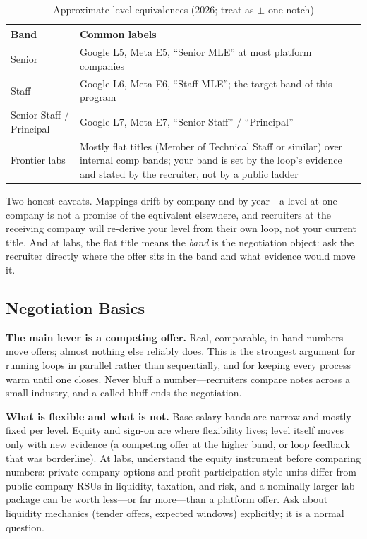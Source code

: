 \begin{table}[H]
\centering
\small
\caption{Approximate level equivalences (2026; treat as $\pm$ one notch)}
\label{tab:level_mapping}
\begin{tabularx}{\textwidth}{lX}
\toprule
\textbf{Band} & \textbf{Common labels} \\
\midrule
Senior & Google L5, Meta E5, ``Senior MLE'' at most platform companies \\
Staff & Google L6, Meta E6, ``Staff MLE''; the target band of this program \\
Senior Staff / Principal & Google L7, Meta E7, ``Senior Staff'' / ``Principal'' \\
Frontier labs & Mostly flat titles (Member of Technical Staff or similar) over internal comp bands; your band is set by the loop's evidence and stated by the recruiter, not by a public ladder \\
\bottomrule
\end{tabularx}
\end{table}

Two honest caveats. Mappings drift by company and by year---a level at one company is not a promise of the equivalent elsewhere, and recruiters at the receiving company will re-derive your level from their own loop, not your current title. And at labs, the flat title means the \textit{band} is the negotiation object: ask the recruiter directly where the offer sits in the band and what evidence would move it.

\subsection{Negotiation Basics}

\textbf{The main lever is a competing offer.} Real, comparable, in-hand numbers move offers; almost nothing else reliably does. This is the strongest argument for running loops in parallel rather than sequentially, and for keeping every process warm until one closes. Never bluff a number---recruiters compare notes across a small industry, and a called bluff ends the negotiation.

\textbf{What is flexible and what is not.} Base salary bands are narrow and mostly fixed per level. Equity and sign-on are where flexibility lives; level itself moves only with new evidence (a competing offer at the higher band, or loop feedback that was borderline). At labs, understand the equity instrument before comparing numbers: private-company options and profit-participation-style units differ from public-company RSUs in liquidity, taxation, and risk, and a nominally larger lab package can be worth less---or far more---than a platform offer. Ask about liquidity mechanics (tender offers, expected windows) explicitly; it is a normal question.


